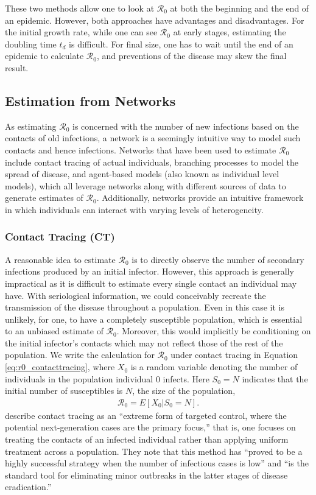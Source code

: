 \documentclass[12pt]{article}
\newcommand{\rr}{\ensuremath{\mathcal{R}_0}}
\begin{document}
  These two methods allow one to look at $\rr$ at both the beginning and the end of an epidemic.  However, both approaches have advantages and disadvantages.  For the initial growth rate, while one can see $\rr$ at early stages, estimating the doubling time $t_d$ is difficult.  For final size, one has to wait until the end of an epidemic to calculate $\rr$, and preventions of the disease may skew the final result.

  \subsection{Estimation from Networks}
As estimating $\rr$ is concerned with the number of new infections based on the contacts of old infections, a network is a seemingly intuitive way to model such contacts and hence infections.  Networks that have been used to estimate $\rr$ include contact tracing of actual individuals, branching processes to model the spread of disease, and agent-based models (also known as individual level models), which all leverage networks along with different sources of data to generate estimates of $\rr$.  Additionally, networks provide an intuitive framework in which individuals can interact with varying levels of heterogeneity.
  
\label{sec:network}

\subsubsection{Contact Tracing (CT)}
\label{sec:contact_tracing}
A reasonable idea to estimate $\rr$ is to directly observe the number of secondary infections produced by an initial infector.  However, this approach is generally impractical as it is difficult to estimate every single contact an individual may have.   With seriological information, we could conceivably recreate the transmission of the disease throughout a population.  Even in this case it is unlikely, for one, to have a completely susceptible population, which is essential to an unbiased estimate of $\rr$.  Moreover, this would implicitly be conditioning on the initial infector's contacts which may not reflect those of the rest of the population.  We write the calculation for $\rr$ under contact tracing in Equation \ref{eq:r0_contacttracing}, where $X_0$ is a random variable denoting the number of individuals in the population individual 0 infects.  Here $S_0=N$ indicates that the initial number of susceptibles is $N$, the size of the population,
\begin{align}\label{eq:r0_contacttracing}
\rr = E[ X_0 | S_0 = N].
\end{align}
\cite{eames2003} describe contact tracing as an ``extreme form of targeted control, where the potential next-generation cases are the primary focus,'' that is, one focuses on treating the contacts of an infected individual rather than applying uniform treatment across a population.  They note that this method has ``proved to be a highly successful strategy when the number of infectious cases is low'' and ``is the standard tool for eliminating minor outbreaks in the latter stages of disease eradication.''
\end{document}
